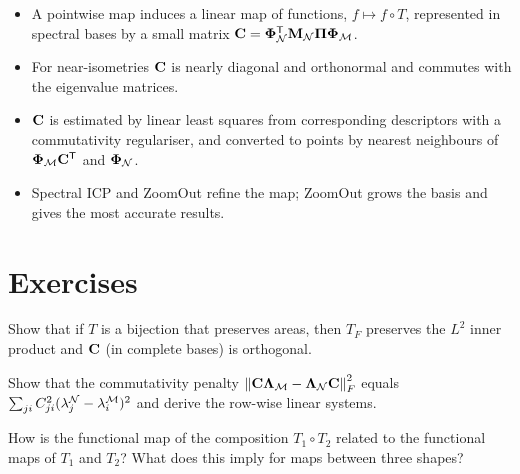 \begin{keypoints}
\begin{itemize}[leftmargin=*]
  \item A pointwise map induces a linear map of functions, $f\mapsto f\circ T$, represented in spectral
  bases by a small matrix $\mathbf{C}=\boldsymbol{\Phi}_{\mathcal{N}}^{\mathsf{T}}\mathbf{M}_{\mathcal{N}}\boldsymbol{\Pi}\boldsymbol{\Phi}_{\mathcal{M}}$.
  \item For near-isometries $\mathbf{C}$ is nearly diagonal and orthonormal and commutes with the eigenvalue
  matrices.
  \item $\mathbf{C}$ is estimated by linear least squares from corresponding descriptors with a commutativity
  regulariser, and converted to points by nearest neighbours of $\boldsymbol{\Phi}_{\mathcal{M}}\mathbf{C}^{\mathsf{T}}$ and $\boldsymbol{\Phi}_{\mathcal{N}}$.
  \item Spectral ICP and ZoomOut refine the map; ZoomOut grows the basis and gives the most accurate
  results.
\end{itemize}
\end{keypoints}

\section*{Exercises}
\begin{exercise}
Show that if $T$ is a bijection that preserves areas, then $T_F$ preserves the $L^2$ inner product and
$\mathbf{C}$ (in complete bases) is orthogonal.
\end{exercise}
\begin{exercise}
Show that the commutativity penalty $\left\lVert \mathbf{C}\boldsymbol{\Lambda}_{\mathcal{M}}-\boldsymbol{\Lambda}_{\mathcal{N}}\mathbf{C}\right\rVert_F^2$ equals
$\sum_{ji}C_{ji}^2(\lambda_j^{\mathcal{N}}-\lambda_i^{\mathcal{M}})^2$ and derive the row-wise linear systems.
\end{exercise}
\begin{exercise}
How is the functional map of the composition $T_1\circ T_2$ related to the functional maps of $T_1$ and
$T_2$? What does this imply for maps between three shapes?
\end{exercise}
